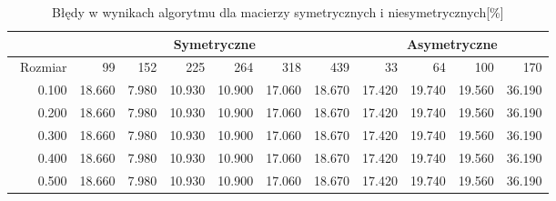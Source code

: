 \begin{table}
\centering
\begin{tabular}{|r|r|r|r|r|r|r|r|r|r|r|}
\hline
 & \multicolumn{6}{|c|}{Symetryczne} & \multicolumn{4}{|c|}{Asymetryczne} \\ \hline\
Rozmiar & 99 & 152 & 225 & 264 & 318 & 439 & 33 & 64 & 100 & 170 \\ \hline
0.100 & 18.660 & 7.980 & 10.930 & 10.900 & 17.060 & 18.670 & 17.420 & 19.740 & 19.560 & 36.190 \\
0.200 & 18.660 & 7.980 & 10.930 & 10.900 & 17.060 & 18.670 & 17.420 & 19.740 & 19.560 & 36.190 \\
0.300 & 18.660 & 7.980 & 10.930 & 10.900 & 17.060 & 18.670 & 17.420 & 19.740 & 19.560 & 36.190 \\
0.400 & 18.660 & 7.980 & 10.930 & 10.900 & 17.060 & 18.670 & 17.420 & 19.740 & 19.560 & 36.190 \\
0.500 & 18.660 & 7.980 & 10.930 & 10.900 & 17.060 & 18.670 & 17.420 & 19.740 & 19.560 & 36.190 \\ \hline
\end{tabular}
\caption{Błędy w wynikach algorytmu dla macierzy symetrycznych i niesymetrycznych[\%]}
\label{tab:error_AoRho}
\end{table}
